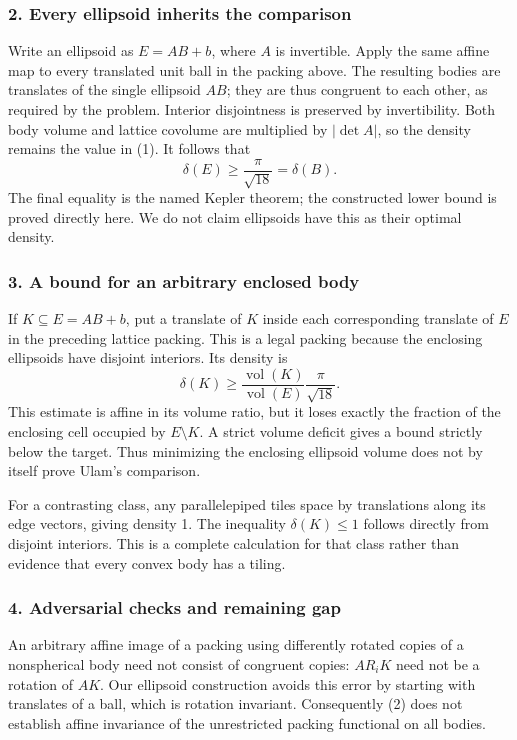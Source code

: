 \documentclass[11pt,a4paper]{article}
\begin{document}
\subsubsection{2. Every ellipsoid inherits the comparison}
Write an ellipsoid as $E=AB+b$, where $A$ is invertible. Apply the same affine map to every translated unit ball in the packing above. The resulting bodies are translates of the single ellipsoid $AB$; they are thus congruent to each other, as required by the problem. Interior disjointness is preserved by invertibility. Both body volume and lattice covolume are multiplied by $|\det A|$, so the density remains the value in (1). It follows that
\[\delta(E)\geq\frac\pi{\sqrt{18}}=\delta(B).\tag{2}\]
The final equality is the named Kepler theorem; the constructed lower bound is proved directly here. We do not claim ellipsoids have this as their optimal density.

\subsubsection{3. A bound for an arbitrary enclosed body}
If $K\subseteq E=AB+b$, put a translate of $K$ inside each corresponding translate of $E$ in the preceding lattice packing. This is a legal packing because the enclosing ellipsoids have disjoint interiors. Its density is
\[\delta(K)\geq\frac{\operatorname{vol}(K)}{\operatorname{vol}(E)}
\frac\pi{\sqrt{18}}.\tag{3}\]
This estimate is affine in its volume ratio, but it loses exactly the fraction of the enclosing cell occupied by $E\setminus K$. A strict volume deficit gives a bound strictly below the target. Thus minimizing the enclosing ellipsoid volume does not by itself prove Ulam's comparison.

For a contrasting class, any parallelepiped tiles space by translations along its edge vectors, giving density 1. The inequality $\delta(K)\leq1$ follows directly from disjoint interiors. This is a complete calculation for that class rather than evidence that every convex body has a tiling.

\subsubsection{4. Adversarial checks and remaining gap}
An arbitrary affine image of a packing using differently rotated copies of a nonspherical body need not consist of congruent copies: $AR_iK$ need not be a rotation of $AK$. Our ellipsoid construction avoids this error by starting with translates of a ball, which is rotation invariant. Consequently (2) does not establish affine invariance of the unrestricted packing functional on all bodies.
\end{document}
